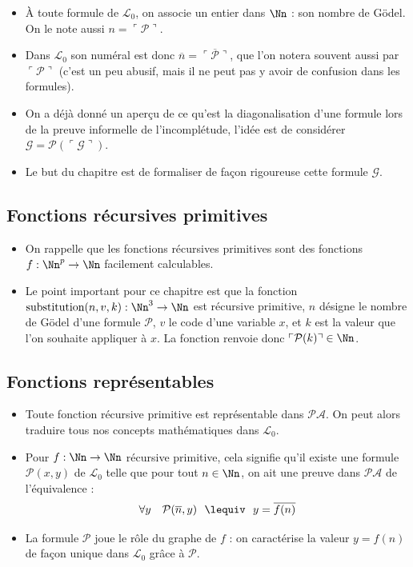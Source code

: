 \documentclass[11pt,class=report,crop=false]{standalone}
\begin{document}
\begin{itemize}
    \item À toute formule de $\mathcal{L}_0$, on associe un entier dans $\Nn$ : son nombre de Gödel. On le note aussi $n = \ulcorner \mathcal{P} \urcorner$.
    \item Dans $\mathcal{L}_0$ son numéral est donc $\overline{n} = \overline{\ulcorner \mathcal{P} \urcorner}$, que l'on notera souvent  aussi par $\ulcorner \mathcal{P} \urcorner$ (c'est un peu abusif, mais il ne peut pas y avoir de confusion dans les formules).
    \item On a déjà donné un aperçu de ce qu'est la diagonalisation d'une formule lors de la preuve informelle de l'incomplétude, l'idée est de considérer $\mathcal{G} = \mathcal{P}({\ulcorner \mathcal{G} \urcorner})$.
    \item Le but du chapitre est de formaliser de façon rigoureuse cette formule $\mathcal{G}$.
\end{itemize}

\subsection{Fonctions récursives primitives}

\begin{itemize}
    \item On rappelle que les fonctions récursives primitives sont des fonctions $f : \Nn^p \to \Nn$ facilement calculables. 
    \item Le point important pour ce chapitre est que la fonction $\text{substitution}(n, v, k) : \Nn^3 \to \Nn$ est récursive primitive,
    $n$ désigne le nombre de Gödel d'une formule $\mathcal{P}$, $v$ le code d'une variable $x$, et $k$ est la valeur que l'on souhaite appliquer à $x$. La fonction renvoie donc $\ulcorner \mathcal{P}({k}) \urcorner \in \Nn$.
\end{itemize}

\subsection{Fonctions représentables}

\begin{itemize}
    \item Toute fonction récursive primitive est représentable dans $\mathcal{PA}$. On peut alors traduire tous nos concepts mathématiques dans $\mathcal{L}_0$.
    \item Pour $f : \Nn \to \Nn$ récursive primitive, cela signifie qu'il existe une formule $\mathcal{P}(x,y)$ de $\mathcal{L}_0$ telle que pour tout $n \in \Nn$, on ait une preuve dans $\mathcal{PA}$ de l'équivalence :
    \[ \forall y \quad  \mathcal{P}(\overline{n},y) \ \ \lequiv \ \ y=\overline{f(n)}  \]
    \item La formule $\mathcal{P}$ joue le rôle du graphe de $f$ : on caractérise la valeur $y=f(n)$ de façon unique dans $\mathcal{L}_0$ grâce à $\mathcal{P}$.
\end{itemize}
\end{document}
